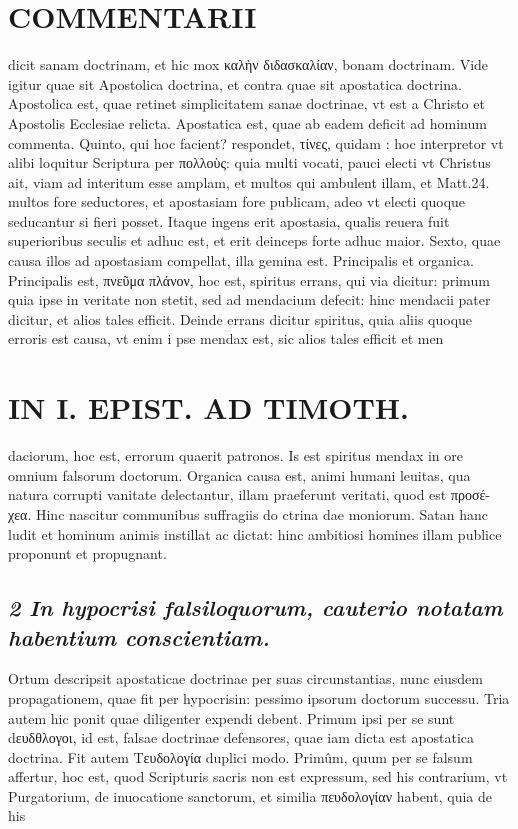 \documentclass{article}
\begin{document}
\begin{pages}
\section*{COMMENTARII }
\marginpar{[ p.86 ]}\pstart dicit sanam doctrinam, et hic mox καλὴν διδασκαλίαν, bonam doctrinam. Vide igitur quae sit Apostolica doctrina, et contra quae sit apostatica doctrina. Apostolica est, quae retinet simplicitatem sanae doctrinae, vt est a Christo et Apostolis Ecclesiae relicta. Apostatica est, quae ab eadem deficit ad hominum commenta.  \pend\pstart Quinto, qui hoc facient? respondet, τίνες, quidam : hoc interpretor vt alibi loquitur Scriptura per πολλοὺς: quia multi vocati, pauci electi vt Christus ait, viam ad interitum esse amplam, et multos qui ambulent illam, et Matt.24. multos fore seductores, et apostasiam fore publicam, adeo vt electi quoque seducantur si fieri posset. Itaque ingens erit apostasia, qualis reuera fuit superioribus seculis et adhuc est, et erit deinceps forte adhuc maior.  \pend\pstart Sexto, quae causa illos ad apostasiam compellat, illa gemina est. Principalis et organica. Principalis est, πνεῦμα πλάνον, hoc est, spiritus errans, qui via dicitur: primum quia ipse in veritate non stetit, sed ad mendacium defecit: hinc mendacii pater dicitur, et alios tales efficit. Deinde errans dicitur spiritus, quia aliis quoque erroris est causa, vt enim i pse mendax est, sic alios tales efficit et men\pend
\section*{IN I. EPIST. AD TIMOTH. }
\marginpar{[ p.87 ]}\pstart daciorum, hoc est, errorum quaerit patronos. Is est spiritus mendax in ore omnium falsorum doctorum.  \pend\pstart Organica causa est, animi humani leuitas, qua natura corrupti vanitate delectantur, illam praeferunt veritati, quod est προσέ- χεα. Hinc nascitur communibus suffragiis do ctrina dae moniorum. Satan hanc ludit et hominum animis instillat ac dictat: hinc ambitiosi homines illam publice proponunt et propugnant.  \pend
{}
{}
\subsection*{\textit{2 In hypocrisi falsiloquorum, cauterio notatam habentium conscientiam. }}\pstart Ortum descripsit apostaticae doctrinae per suas circunstantias, nunc eiusdem propagationem, quae fit per hypocrisin: pessimo ipsorum doctorum successu. Tria autem hic ponit quae diligenter expendi debent. Primum ipsi per se sunt dευδθλογοι, id est, falsae doctrinae defensores, quae iam dicta est apostatica doctrina. Fit autem Τευδολογία duplici modo. Primûm, quum per se falsum affertur, hoc est, quod Scripturis sacris non est expressum, sed his contrarium, vt Purgatorium, de inuocatione sanctorum, et similia πευδολογίαν habent, quia de his  \pend

\end{pages}
\end{document}
